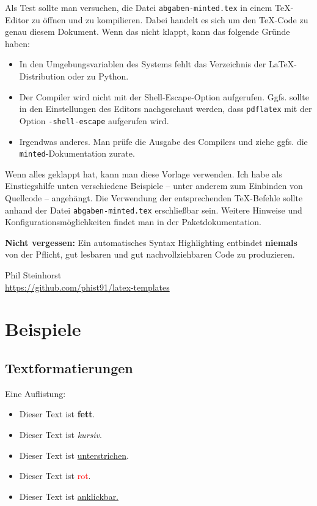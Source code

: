 Als Test sollte man versuchen, die Datei \texttt{abgaben-minted.tex} in einem TeX-Editor zu öffnen und zu kompilieren.
Dabei handelt es sich um den TeX-Code zu genau diesem Dokument.
Wenn das nicht klappt, kann das folgende Gründe haben:
\begin{itemize}
  \item In den Umgebungsvariablen des Systems fehlt das Verzeichnis der \LaTeX-Distribution oder zu Python.
  \item Der Compiler wird nicht mit der Shell-Escape-Option aufgerufen.
    Ggfs. sollte in den Einstellungen des Editors nachgeschaut werden, dass \texttt{pdflatex} mit der Option \texttt{-shell-escape} aufgerufen wird.
  \item Irgendwas anderes. Man prüfe die Ausgabe des Compilers und ziehe ggfs. die \texttt{minted}-Dokumentation zurate.
\end{itemize}
Wenn alles geklappt hat, kann man diese Vorlage verwenden.
Ich habe als Einstiegshilfe unten verschiedene Beispiele -- unter anderem zum Einbinden von Quellcode -- angehängt.
Die Verwendung der entsprechenden TeX-Befehle sollte anhand der Datei \texttt{abgaben-minted.tex} erschließbar sein.
Weitere Hinweise und Konfigurationsmöglichkeiten findet man in der Paketdokumentation.

\textbf{Nicht vergessen:} Ein automatisches Syntax Highlighting entbindet \textbf{niemals} von der Pflicht, gut lesbaren und gut nachvollziehbaren Code zu produzieren.

\begin{flushright}
Phil Steinhorst \\
\url{https://github.com/phist91/latex-templates}
\end{flushright}

\newpage

\section*{Beispiele}
\subsection*{Textformatierungen}
Eine Auflistung:
\begin{itemize}
  \item Dieser Text ist \textbf{fett}.
  \item Dieser Text ist \textit{kursiv}.
  \item Dieser Text ist \underline{unterstrichen}.
  \item Dieser Text ist \textcolor{red}{rot}.
  \item Dieser Text ist \href{https://gitlab.com/phist91/latex-templates}{anklickbar.}
\end{itemize}

